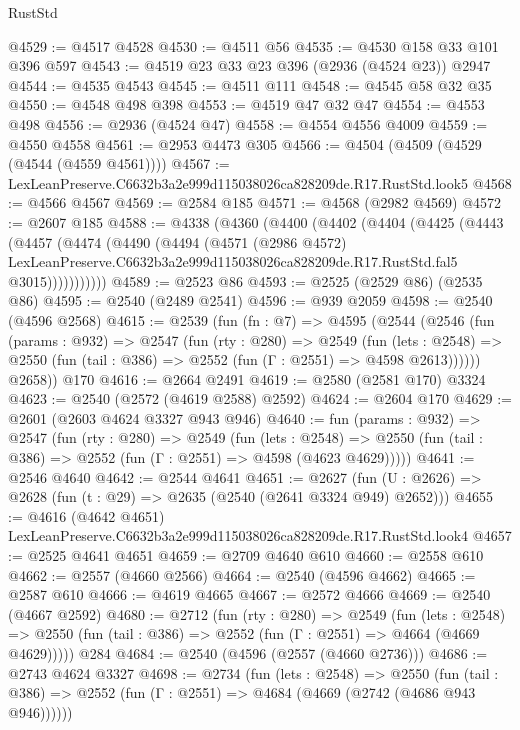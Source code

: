 \begin{lexlean}{RustStd}
\begin{coremodule}
@4529 := @4517 @4528
@4530 := @4511 @56
@4535 := @4530 @158 @33 @101 @396 @597
@4543 := @4519 @23 @33 @23 @396 (@2936 (@4524 @23)) @2947
@4544 := @4535 @4543
@4545 := @4511 @111
@4548 := @4545 @58 @32 @35
@4550 := @4548 @498 @398
@4553 := @4519 @47 @32 @47
@4554 := @4553 @498
@4556 := @2936 (@4524 @47)
@4558 := @4554 @4556 @4009
@4559 := @4550 @4558
@4561 := @2953 @4473 @305
@4566 := @4504 (@4509 (@4529 (@4544 (@4559 @4561))))
@4567 := LexLeanPreserve.C6632b3a2e999d115038026ca828209de.R17.RustStd.look5
@4568 := @4566 @4567
@4569 := @2584 @185
@4571 := @4568 (@2982 @4569)
@4572 := @2607 @185
@4588 := @4338
    (@4360
      (@4400
        (@4402
          (@4404
            (@4425
              (@4443
                (@4457
                  (@4474
                    (@4490
                      (@4494
                        (@4571
                          (@2986 @4572)
                          LexLeanPreserve.C6632b3a2e999d115038026ca828209de.R17.RustStd.fal5
                          @3015)))))))))))
@4589 := @2523 @86
@4593 := @2525 (@2529 @86) (@2535 @86)
@4595 := @2540 (@2489 @2541)
@4596 := @939 @2059
@4598 := @2540 (@4596 @2568)
@4615 := @2539
    (fun (fn : @7) =>
    @4595
      (@2544
        (@2546
          (fun (params : @932) =>
          @2547
            (fun (rty : @280) =>
            @2549
              (fun (lets : @2548) =>
              @2550 (fun (tail : @386) => @2552 (fun (Γ : @2551) => @4598 @2613))))))
        @2658))
    @170
@4616 := @2664 @2491
@4619 := @2580 (@2581 @170) @3324
@4623 := @2540 (@2572 (@4619 @2588) @2592)
@4624 := @2604 @170
@4629 := @2601 (@2603 @4624 @3327 @943 @946)
@4640 := fun (params : @932) =>
  @2547
    (fun (rty : @280) =>
    @2549
      (fun (lets : @2548) =>
      @2550 (fun (tail : @386) => @2552 (fun (Γ : @2551) => @4598 (@4623 @4629)))))
@4641 := @2546 @4640
@4642 := @2544 @4641
@4651 := @2627 (fun (U : @2626) => @2628 (fun (t : @29) => @2635 (@2540 (@2641 @3324 @949) @2652)))
@4655 := @4616 (@4642 @4651) LexLeanPreserve.C6632b3a2e999d115038026ca828209de.R17.RustStd.look4
@4657 := @2525 @4641 @4651
@4659 := @2709 @4640 @610
@4660 := @2558 @610
@4662 := @2557 (@4660 @2566)
@4664 := @2540 (@4596 @4662)
@4665 := @2587 @610
@4666 := @4619 @4665
@4667 := @2572 @4666
@4669 := @2540 (@4667 @2592)
@4680 := @2712
    (fun (rty : @280) =>
    @2549
      (fun (lets : @2548) =>
      @2550 (fun (tail : @386) => @2552 (fun (Γ : @2551) => @4664 (@4669 @4629)))))
    @284
@4684 := @2540 (@4596 (@2557 (@4660 @2736)))
@4686 := @2743 @4624 @3327
@4698 := @2734
    (fun (lets : @2548) =>
    @2550 (fun (tail : @386) => @2552 (fun (Γ : @2551) => @4684 (@4669 (@2742 (@4686 @943 @946))))))

\end{coremodule}
\end{lexlean}
